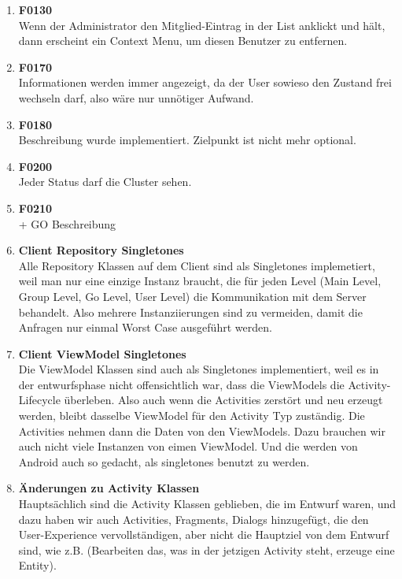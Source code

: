 \documentclass[11pt,a4paper]{scrartcl}
\begin{document}
\begin{enumerate}
\item \textbf{F0130}\\ Wenn der Administrator den Mitglied-Eintrag in der List anklickt und hält, dann erscheint ein Context Menu, um diesen Benutzer zu entfernen.

\item \textbf{F0170}\\ Informationen werden immer angezeigt, da der User sowieso den Zustand frei wechseln darf, also wäre nur unnötiger Aufwand.

\item \textbf{F0180}\\ Beschreibung wurde implementiert. Zielpunkt ist nicht mehr optional.

\item \textbf{F0200}\\ Jeder Status darf die Cluster sehen.

\item \textbf{F0210}\\ + GO Beschreibung

\item \textbf{Client Repository Singletones}\\
	Alle Repository Klassen auf dem Client sind als Singletones implemetiert, weil man nur eine einzige Instanz braucht, die für jeden Level (Main Level,  Group Level, Go Level, User Level) die Kommunikation mit dem Server behandelt. Also mehrere Instanziierungen sind zu vermeiden, damit die Anfragen nur einmal Worst Case ausgeführt werden.
	
\item \textbf{Client ViewModel Singletones}\\
Die ViewModel Klassen sind auch als Singletones implementiert, weil es in der entwurfsphase nicht offensichtlich war, dass die ViewModels die Activity-Lifecycle überleben. Also auch wenn die Activities zerstört und neu erzeugt werden, bleibt dasselbe ViewModel für den Activity Typ zuständig. Die Activities nehmen dann die Daten von den ViewModels. Dazu brauchen wir auch nicht viele Instanzen von eimen ViewModel. Und die werden von Android auch so gedacht, als singletones benutzt zu werden.

\item \textbf{Änderungen zu Activity Klassen}\\
Hauptsächlich sind die Activity Klassen geblieben, die im Entwurf waren, und dazu haben wir auch Activities, Fragments, Dialogs hinzugefügt, die den User-Experience vervollständigen, aber nicht die Hauptziel von dem Entwurf sind, wie z.B. (Bearbeiten das, was in der jetzigen Activity steht, erzeuge eine Entity).


\end{enumerate}
\end{document}
